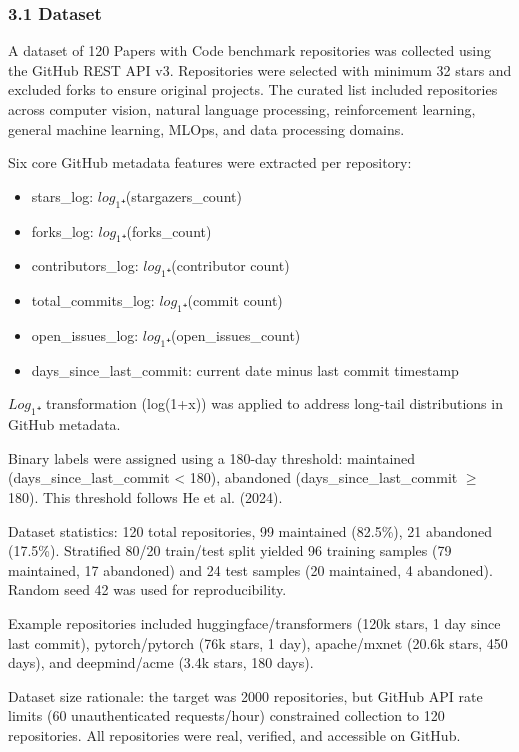 
\subsubsection{3.1 Dataset}

A dataset of 120 Papers with Code benchmark repositories was collected using the GitHub REST API v3. Repositories were selected with minimum 32 stars and excluded forks to ensure original projects. The curated list included repositories across computer vision, natural language processing, reinforcement learning, general machine learning, MLOps, and data processing domains.

Six core GitHub metadata features were extracted per repository:
\begin{itemize}
\item stars\_log: $log_1$₊(stargazers\_count)
\item forks\_log: $log_1$₊(forks\_count)
\item contributors\_log: $log_1$₊(contributor count)
\item total\_commits\_log: $log_1$₊(commit count)
\item open\_issues\_log: $log_1$₊(open\_issues\_count)
\item days\_since\_last\_commit: current date minus last commit timestamp
\end{itemize}

$Log_1$₊ transformation (log(1+x)) was applied to address long-tail distributions in GitHub metadata.

Binary labels were assigned using a 180-day threshold: maintained (days\_since\_last\_commit < 180), abandoned (days\_since\_last\_commit $\geq$ 180). This threshold follows He et al. (2024).

Dataset statistics: 120 total repositories, 99 maintained (82.5\%), 21 abandoned (17.5\%). Stratified 80/20 train/test split yielded 96 training samples (79 maintained, 17 abandoned) and 24 test samples (20 maintained, 4 abandoned). Random seed 42 was used for reproducibility.

Example repositories included huggingface/transformers (120k stars, 1 day since last commit), pytorch/pytorch (76k stars, 1 day), apache/mxnet (20.6k stars, 450 days), and deepmind/acme (3.4k stars, 180 days).

Dataset size rationale: the target was 2000 repositories, but GitHub API rate limits (60 unauthenticated requests/hour) constrained collection to 120 repositories. All repositories were real, verified, and accessible on GitHub.

